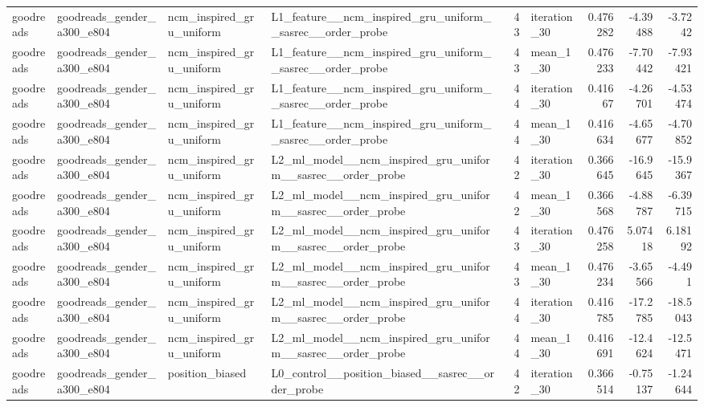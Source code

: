 \begin{table}[htbp!]
\begin{tabular}{llllrlrrr}
goodreads & goodreads\_gender\_a300\_e804 & ncm\_inspired\_gru\_uniform & L1\_feature\_\_ncm\_inspired\_gru\_uniform\_\_sasrec\_\_order\_probe & 43 & iteration\_30 & 0.476282 & -4.39488 & -3.7242 \\
goodreads & goodreads\_gender\_a300\_e804 & ncm\_inspired\_gru\_uniform & L1\_feature\_\_ncm\_inspired\_gru\_uniform\_\_sasrec\_\_order\_probe & 43 & mean\_1\_30 & 0.476233 & -7.70442 & -7.93421 \\
goodreads & goodreads\_gender\_a300\_e804 & ncm\_inspired\_gru\_uniform & L1\_feature\_\_ncm\_inspired\_gru\_uniform\_\_sasrec\_\_order\_probe & 44 & iteration\_30 & 0.41667 & -4.26701 & -4.53474 \\
goodreads & goodreads\_gender\_a300\_e804 & ncm\_inspired\_gru\_uniform & L1\_feature\_\_ncm\_inspired\_gru\_uniform\_\_sasrec\_\_order\_probe & 44 & mean\_1\_30 & 0.416634 & -4.65677 & -4.70852 \\
goodreads & goodreads\_gender\_a300\_e804 & ncm\_inspired\_gru\_uniform & L2\_ml\_model\_\_ncm\_inspired\_gru\_uniform\_\_sasrec\_\_order\_probe & 42 & iteration\_30 & 0.366645 & -16.9645 & -15.9367 \\
goodreads & goodreads\_gender\_a300\_e804 & ncm\_inspired\_gru\_uniform & L2\_ml\_model\_\_ncm\_inspired\_gru\_uniform\_\_sasrec\_\_order\_probe & 42 & mean\_1\_30 & 0.366568 & -4.88787 & -6.39715 \\
goodreads & goodreads\_gender\_a300\_e804 & ncm\_inspired\_gru\_uniform & L2\_ml\_model\_\_ncm\_inspired\_gru\_uniform\_\_sasrec\_\_order\_probe & 43 & iteration\_30 & 0.476258 & 5.07418 & 6.18192 \\
goodreads & goodreads\_gender\_a300\_e804 & ncm\_inspired\_gru\_uniform & L2\_ml\_model\_\_ncm\_inspired\_gru\_uniform\_\_sasrec\_\_order\_probe & 43 & mean\_1\_30 & 0.476234 & -3.65566 & -4.491 \\
goodreads & goodreads\_gender\_a300\_e804 & ncm\_inspired\_gru\_uniform & L2\_ml\_model\_\_ncm\_inspired\_gru\_uniform\_\_sasrec\_\_order\_probe & 44 & iteration\_30 & 0.416785 & -17.2785 & -18.5043 \\
goodreads & goodreads\_gender\_a300\_e804 & ncm\_inspired\_gru\_uniform & L2\_ml\_model\_\_ncm\_inspired\_gru\_uniform\_\_sasrec\_\_order\_probe & 44 & mean\_1\_30 & 0.416691 & -12.4624 & -12.5471 \\
goodreads & goodreads\_gender\_a300\_e804 & position\_biased & L0\_control\_\_position\_biased\_\_sasrec\_\_order\_probe & 42 & iteration\_30 & 0.366514 & -0.75137 & -1.24644 \\

\end{tabular}
\end{table}
